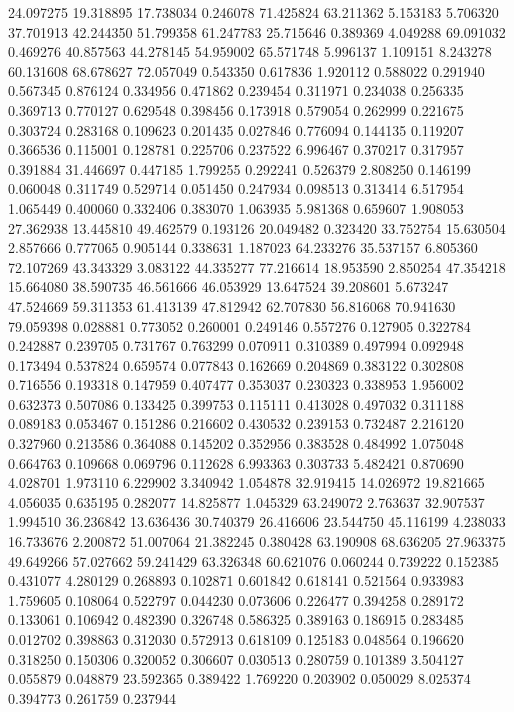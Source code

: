 24.097275
19.318895
17.738034
0.246078
71.425824
63.211362
5.153183
5.706320
37.701913
42.244350
51.799358
61.247783
25.715646
0.389369
4.049288
69.091032
0.469276
40.857563
44.278145
54.959002
65.571748
5.996137
1.109151
8.243278
60.131608
68.678627
72.057049
0.543350
0.617836
1.920112
0.588022
0.291940
0.567345
0.876124
0.334956
0.471862
0.239454
0.311971
0.234038
0.256335
0.369713
0.770127
0.629548
0.398456
0.173918
0.579054
0.262999
0.221675
0.303724
0.283168
0.109623
0.201435
0.027846
0.776094
0.144135
0.119207
0.366536
0.115001
0.128781
0.225706
0.237522
6.996467
0.370217
0.317957
0.391884
31.446697
0.447185
1.799255
0.292241
0.526379
2.808250
0.146199
0.060048
0.311749
0.529714
0.051450
0.247934
0.098513
0.313414
6.517954
1.065449
0.400060
0.332406
0.383070
1.063935
5.981368
0.659607
1.908053
27.362938
13.445810
49.462579
0.193126
20.049482
0.323420
33.752754
15.630504
2.857666
0.777065
0.905144
0.338631
1.187023
64.233276
35.537157
6.805360
72.107269
43.343329
3.083122
44.335277
77.216614
18.953590
2.850254
47.354218
15.664080
38.590735
46.561666
46.053929
13.647524
39.208601
5.673247
47.524669
59.311353
61.413139
47.812942
62.707830
56.816068
70.941630
79.059398
0.028881
0.773052
0.260001
0.249146
0.557276
0.127905
0.322784
0.242887
0.239705
0.731767
0.763299
0.070911
0.310389
0.497994
0.092948
0.173494
0.537824
0.659574
0.077843
0.162669
0.204869
0.383122
0.302808
0.716556
0.193318
0.147959
0.407477
0.353037
0.230323
0.338953
1.956002
0.632373
0.507086
0.133425
0.399753
0.115111
0.413028
0.497032
0.311188
0.089183
0.053467
0.151286
0.216602
0.430532
0.239153
0.732487
2.216120
0.327960
0.213586
0.364088
0.145202
0.352956
0.383528
0.484992
1.075048
0.664763
0.109668
0.069796
0.112628
6.993363
0.303733
5.482421
0.870690
4.028701
1.973110
6.229902
3.340942
1.054878
32.919415
14.026972
19.821665
4.056035
0.635195
0.282077
14.825877
1.045329
63.249072
2.763637
32.907537
1.994510
36.236842
13.636436
30.740379
26.416606
23.544750
45.116199
4.238033
16.733676
2.200872
51.007064
21.382245
0.380428
63.190908
68.636205
27.963375
49.649266
57.027662
59.241429
63.326348
60.621076
0.060244
0.739222
0.152385
0.431077
4.280129
0.268893
0.102871
0.601842
0.618141
0.521564
0.933983
1.759605
0.108064
0.522797
0.044230
0.073606
0.226477
0.394258
0.289172
0.133061
0.106942
0.482390
0.326748
0.586325
0.389163
0.186915
0.283485
0.012702
0.398863
0.312030
0.572913
0.618109
0.125183
0.048564
0.196620
0.318250
0.150306
0.320052
0.306607
0.030513
0.280759
0.101389
3.504127
0.055879
0.048879
23.592365
0.389422
1.769220
0.203902
0.050029
8.025374
0.394773
0.261759
0.237944
